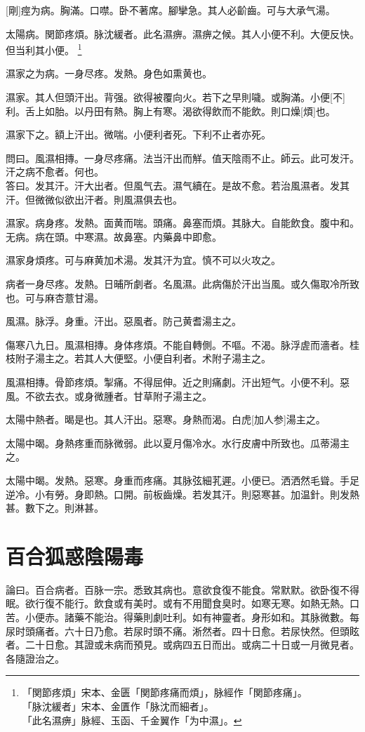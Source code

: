 \documentclass[12pt,twoside,UTF8,b5paper]{ctexbook}
\begin{document}
[剛]痙为病。胸滿。口噤。卧不著席。腳攣急。其人必齘齒。可与大承气湯。

太陽病。関節疼煩。脉沈緩者。此名濕痹。濕痹之候。其人小便不利。大便反快。但当利其小便。
	\footnote{「関節疼煩」宋本、金匮「関節疼痛而煩」，脉經作「関節疼痛」。\\「脉沈緩者」宋本、金匱作「脉沈而細者」。\\「此名濕痹」脉經、玉函、千金翼作「为中濕」。}

濕家之为病。一身尽疼。发熱。身色如熏黄也。

濕家。其人但頭汗出。背强。欲得被覆向火。若下之早則噦。或胸滿。小便[不]利。舌上如胎。以丹田有熱。胸上有寒。渴欲得飲而不能飲。則口燥[煩]也。

濕家下之。額上汗出。微喘。小便利者死。下利不止者亦死。

問曰。風濕相摶。一身尽疼痛。法当汗出而觧。值天陰雨不止。師云。此可发汗。汗之病不愈者。何也。\\
答曰。发其汗。汗大出者。但風气去。濕气續在。是故不愈。若治風濕者。发其汗。但微微似欲出汗者。則風濕俱去也。

濕家。病身疼。发熱。面黄而喘。頭痛。鼻塞而煩。其脉大。自能飲食。腹中和。无病。病在頭。中寒濕。故鼻塞。内藥鼻中即愈。

濕家身煩疼。可与麻黄加术湯。发其汗为宜。慎不可以火攻之。

病者一身尽疼。发熱。日晡所劇者。名風濕。此病傷於汗出当風。或久傷取冷所致也。可与麻杏薏甘湯。

風濕。脉浮。身重。汗出。惡風者。防己黄耆湯主之。

傷寒八九日。風濕相摶。身体疼煩。不能自轉側。不嘔。不渴。脉浮虗而濇者。桂枝附子湯主之。若其人大便堅。小便自利者。术附子湯主之。

風濕相摶。骨節疼煩。掣痛。不得屈伸。近之則痛劇。汗出短气。小便不利。惡風。不欲去衣。或身微腫者。甘草附子湯主之。

太陽中熱者。暍是也。其人汗出。惡寒。身熱而渴。白虎[加人参]湯主之。

太陽中暍。身熱疼重而脉微弱。此以夏月傷冷水。水行皮膚中所致也。瓜蒂湯主之。

太陽中暍。发熱。惡寒。身重而疼痛。其脉弦細芤遲。小便已。洒洒然毛聳。手足逆冷。小有勞。身即熱。口開。前板齒燥。若发其汗。則惡寒甚。加温針。則发熱甚。數下之。則淋甚。

\chapter{百合狐惑陰陽毒}

論曰。百合病者。百脉一宗。悉致其病也。意欲食復不能食。常默默。欲卧復不得眠。欲行復不能行。飲食或有美时。或有不用聞食臭时。如寒无寒。如熱无熱。口苦。小便赤。諸藥不能治。得藥則劇吐利。如有神靈者。身形如和。其脉微數。每尿时頭痛者。六十日乃愈。若尿时頭不痛。淅然者。四十日愈。若尿快然。但頭眩者。二十日愈。其證或未病而預見。或病四五日而出。或病二十日或一月微見者。各隨證治之。
\end{document}
